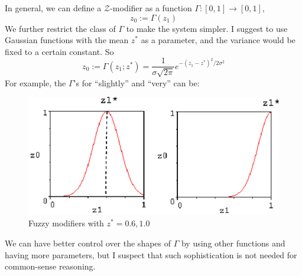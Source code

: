 In general, we can define a $\mathcal{Z}$-modifier as a function $\Gamma: [0,1] \rightarrow [0,1]$,
\begin{equation}
z_0 := \Gamma(z_1)
\end{equation}
We further restrict the class of $\Gamma$ to make the system simpler.  I suggest to use Gaussian functions with the mean $z^*$ as a parameter, and the variance would be fixed to a certain constant.  So
\begin{equation}
z_0 := \Gamma(z_1; z^*) = \frac{1}{\sigma \sqrt{2 \pi}} e^{- (z_1-z^*)^2 / 2 \sigma^2}
\label{eqn:fuzzy-moderator-Gaussian}
\end{equation}
For example, the $\Gamma$'s for ``slightly'' and ``very'' can be:
\begin{figure}[H]
\centering
\includegraphics[scale=0.9]{fuzzy-modifiers.eps}
\caption{Fuzzy modifiers with $z^* = 0.6, 1.0$}
\end{figure}

We can have better control over the shapes of $\Gamma$ by using other functions and having more parameters, but I suspect that such sophistication is not needed for common-sense reasoning.

